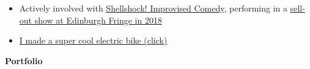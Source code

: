 \documentclass[hidelinks, 12pt, a4paper]{article}
\newcommand{\smitem}[1]{\item {\small {#1}}}
\newenvironment{bullets}{\begin{minipage}[t]{\linewidth}\begin{itemize}[leftmargin=2em,label=-,nosep]}{\end{itemize}\end{minipage}\vspace{2pt}}
\begin{document}
\begin{minipage}{0.58\textwidth}
\begin{bullets}
			\smitem{Actively involved with \href{http://community.dur.ac.uk/dur.improv/}{Shellshock! Improvised Comedy}, performing in a \href{https://www.thespaceuk.com/shows/2018/here-be-improv/}{sell-out show at Edinburgh Fringe in 2018}}
			\smitem{\href{https://i.imgur.com/4Uz2USm.jpg}{I made a super cool electric bike (click)}}
		\end{bullets}
	\end{minipage}
	
	\newpage
	
	\vspace*{12pt}
	
	\begin{center}
		\Huge \textbf{Portfolio}
	\end{center}
	
	\hspace{0.02\textwidth}
\end{document}
